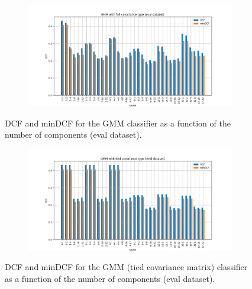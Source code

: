 \documentclass[12pt]{report}
\begin{document}
\begin{figure}[H]
    \centering
    \begin{subfigure}[t]{0.6\textwidth}
        \includegraphics[width=\textwidth]{./plot/eval/GMM/gmm_full.png}
    \end{subfigure}
    \caption{DCF and minDCF for the GMM classifier as a function of the number of components (eval dataset).}
    \label{fig:gmm_full_eval}
\end{figure}

\begin{figure}[H]
    \centering
    \begin{subfigure}[t]{0.6\textwidth}
        \includegraphics[width=\textwidth]{./plot/eval/GMM/gmm_tied.png}
    \end{subfigure}
    \caption{DCF and minDCF for the GMM (tied covariance matrix) classifier as a function of the number of components (eval dataset).}
    \label{fig:gmm_tied_eval}
\end{figure}
\end{document}
